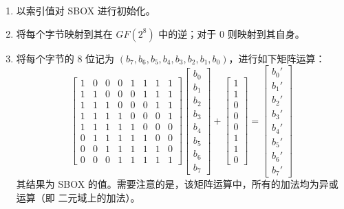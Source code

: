 \documentclass[a4paper, zihao=-4, UTF-8]{ctexart}
\begin{document}
	\begin{enumerate}[1.]
		\item 以索引值对 SBOX 进行初始化。
		\item 将每个字节映射到其在 $GF(2^8)$ 中的逆；对于 $0$ 则映射到其自身。
		\item 将每个字节的 8 位记为 $(b_7, b_6, b_5, b_4, b_3, b_2, b_1, b_0)$，进行如下矩阵运算：
			$$\left[\begin{matrix}
			1 & 0 & 0 & 0 & 1 & 1 & 1 & 1\\
			1 & 1 & 0 & 0 & 0 & 1 & 1 & 1\\
			1 & 1 & 1 & 0 & 0 & 0 & 1 & 1\\
			1 & 1 & 1 & 1 & 0 & 0 & 0 & 1\\
			1 & 1 & 1 & 1 & 1 & 0 & 0 & 0\\
			0 & 1 & 1 & 1 & 1 & 1 & 0 & 0\\
			0 & 0 & 1 & 1 & 1 & 1 & 1 & 0\\
			0 & 0 & 0 & 1 & 1 & 1 & 1 & 1
			\end{matrix}\right]\left[\begin{matrix}
			b_0 \\ b_1 \\ b_2 \\ b_3 \\ b_4 \\ b_5 \\ b_6 \\ b_7
			\end{matrix}\right]+\left[\begin{matrix}
			1 \\ 1 \\ 0 \\ 0 \\ 0 \\ 1 \\ 1 \\ 0
			\end{matrix}\right]=\left[\begin{matrix}
			b_0' \\ b_1' \\ b_2' \\ b_3' \\ b_4' \\ b_5' \\ b_6' \\ b_7'
			\end{matrix}\right]$$
		其结果为 SBOX 的值。需要注意的是，该矩阵运算中，所有的加法均为异或运算（即
		二元域上的加法）。
	\end{enumerate}
	
\end{document}

